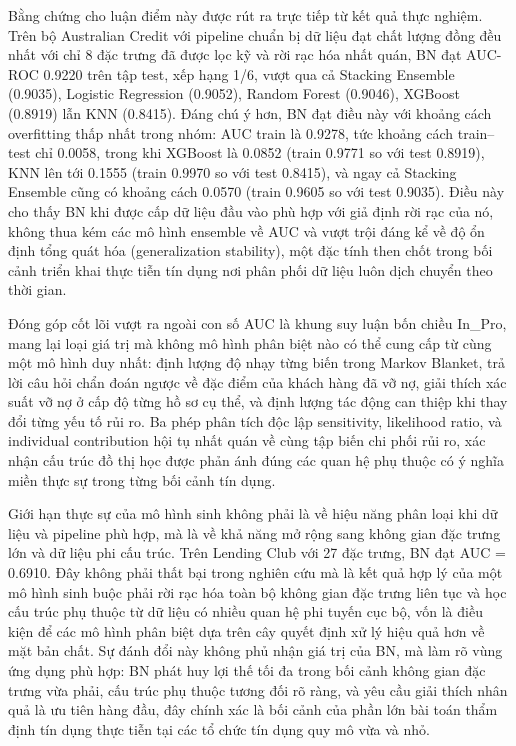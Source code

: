 Bằng chứng cho luận điểm này được rút ra trực tiếp từ kết quả thực nghiệm. Trên bộ Australian Credit với pipeline chuẩn bị dữ liệu đạt chất lượng đồng đều nhất với chỉ 8 đặc trưng đã được lọc kỹ và rời rạc hóa nhất quán, BN đạt AUC-ROC 0.9220 trên tập test, xếp hạng 1/6, vượt qua cả Stacking Ensemble (0.9035), Logistic Regression (0.9052), Random Forest (0.9046), XGBoost (0.8919) lẫn KNN (0.8415). Đáng chú ý hơn, BN đạt điều này với khoảng cách overfitting thấp nhất trong nhóm: AUC train là 0.9278, tức khoảng cách train–test chỉ 0.0058, trong khi XGBoost là 0.0852 (train 0.9771 so với test 0.8919), KNN lên tới 0.1555 (train 0.9970 so với test 0.8415), và ngay cả Stacking Ensemble cũng có khoảng cách 0.0570 (train 0.9605 so với test 0.9035). Điều này cho thấy BN khi được cấp dữ liệu đầu vào phù hợp với giả định rời rạc của nó, không thua kém các mô hình ensemble về AUC và vượt trội đáng kể về độ ổn định tổng quát hóa (generalization stability), một đặc tính then chốt trong bối cảnh triển khai thực tiễn tín dụng nơi phân phối dữ liệu luôn dịch chuyển theo thời gian.


Đóng góp cốt lõi vượt ra ngoài con số AUC là khung suy luận bốn chiều In\_Pro, mang lại loại giá trị mà không mô hình phân biệt nào có thể cung cấp từ cùng một mô hình duy nhất: định lượng độ nhạy từng biến trong Markov Blanket, trả lời câu hỏi chẩn đoán ngược về đặc điểm của khách hàng đã vỡ nợ, giải thích xác suất vỡ nợ ở cấp độ từng hồ sơ cụ thể, và định lượng tác động can thiệp khi thay đổi từng yếu tố rủi ro. Ba phép phân tích độc lập sensitivity, likelihood ratio, và individual contribution hội tụ nhất quán về cùng tập biến chi phối rủi ro, xác nhận cấu trúc đồ thị học được phản ánh đúng các quan hệ phụ thuộc có ý nghĩa miền thực sự trong từng bối cảnh tín dụng.

Giới hạn thực sự của mô hình sinh không phải là về hiệu năng phân loại khi dữ liệu và pipeline phù hợp, mà là về khả năng mở rộng sang không gian đặc trưng lớn và dữ liệu phi cấu trúc. Trên Lending Club với 27 đặc trưng, BN đạt AUC = 0.6910. Đây không phải thất bại trong nghiên cứu mà là kết quả hợp lý của một mô hình sinh buộc phải rời rạc hóa toàn bộ không gian đặc trưng liên tục và học cấu trúc phụ thuộc từ dữ liệu có nhiều quan hệ phi tuyến cục bộ, vốn là điều kiện để các mô hình phân biệt dựa trên cây quyết định xử lý hiệu quả hơn về mặt bản chất. Sự đánh đổi này không phủ nhận giá trị của BN, mà làm rõ vùng ứng dụng phù hợp: BN phát huy lợi thế tối đa trong bối cảnh không gian đặc trưng vừa phải, cấu trúc phụ thuộc tương đối rõ ràng, và yêu cầu giải thích nhân quả là ưu tiên hàng đầu, đây chính xác là bối cảnh của phần lớn bài toán thẩm định tín dụng thực tiễn tại các tổ chức tín dụng quy mô vừa và nhỏ.

